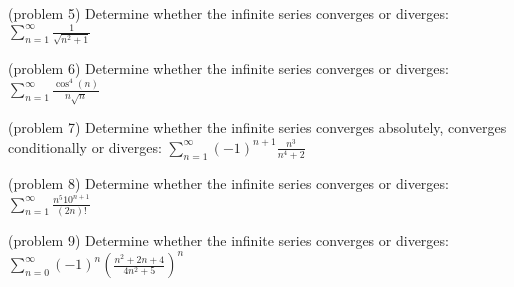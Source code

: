 \documentclass[handout]{ximera}
\begin{document}
\begin{problem}(problem 5)
Determine whether the infinite series converges or diverges: $\displaystyle \sum_{n=1}^\infty \frac{1}{\sqrt{n^2 + 1}}$

\end{problem}

\begin{problem}(problem 6)
Determine whether the infinite series converges or diverges: $\displaystyle \sum_{n=1}^\infty \frac{\cos^4(n)}{n\sqrt{n}}$

\end{problem}

\begin{problem}(problem 7)
Determine whether the infinite series converges absolutely, converges conditionally or diverges: $\displaystyle \sum_{n=1}^\infty (-1)^{n+1} \frac{n^3}{n^4 + 2}$

\end{problem}

\begin{problem}(problem 8)
Determine whether the infinite series converges or diverges: $\displaystyle \sum_{n=1}^\infty \frac{n^5 10^{n+1}}{(2n)!}$

\end{problem}


\begin{problem}(problem 9)
Determine whether the infinite series converges or diverges: $\displaystyle \sum_{n=0}^\infty (-1)^n\left(\frac{n^2 + 2n+ 4}{4n^2 + 5}\right)^n$

\end{problem}
\end{document}
